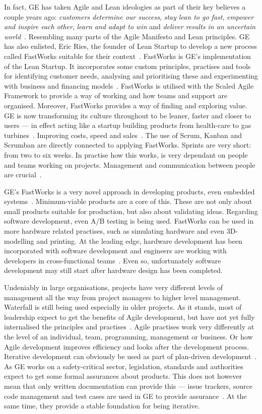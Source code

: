 \documentclass[english]{tktltiki2}
\begin{document}
In fact, GE has taken Agile and Lean ideologies as part of their key believes a couple years ago: \emph{customers determine our success}, \emph{stay lean to go fast}, \emph{empower and inspire each other}, \emph{learn and adapt to win} and \emph{deliver results in an uncertain world}~\cite{BT15}. Resembling many parts of the Agile Manifesto and Lean principles. GE has also enlisted, Eric Ries, the founder of Lean Startup to develop a new process called FastWorks suitable for their context~\cite{GE13, Clo14, Pow14, BT15}. FastWorks is GE’s implementation of the Lean Startup. It incorporates some custom principles, practises and tools for identifying customer needs, analysing and prioritising these and experimenting with business and financing models~\cite{BT15}. FastWorks is utilised with the Scaled Agile Framework to provide a way of working and how teams and support are organised. Moreover, FastWorks provides a way of finding and exploring value. GE is now transforming its culture throughout to be leaner, faster and closer to users — in effect acting like a startup building products from health-care to gas turbines~\cite{GE13, Clo14, Pow14}. Improving costs, speed and sales~\cite{Pow14}. The use of Scrum, Kanban and Scrumban are directly connected to applying FastWorks. Sprints are very short: from two to six weeks. In practise how this works, is very dependant on people and teams working on projects. Management and communication between people are crucial~\cite{BT15}.

GE’s FastWorks is a very novel approach in developing products, even embedded systems~\cite{BT15}. Minimum-viable products are a core of this. These are not only about small products suitable for production, but also about validating ideas. Regarding software development, even A/B testing is being used. FastWorks can be used in more hardware related practises, such as simulating hardware and even 3D-modelling and printing. At the leading edge, hardware development has been incorporated with software development and engineers are working with developers in cross-functional teams~\cite{BT15}. Even so, unfortunately software development may still start after hardware design has been completed.

Undeniably in large organisations, projects have very different levels of management all the way from project managers to higher level management. Waterfall is still being used especially in older projects. As it stands, most of leadership expect to get the benefits of Agile development, but have not yet fully internalised the principles and practises~\cite{BT15}. Agile practises work very differently at the level of an individual, team, programming, management or business. Or how Agile development improves efficiency and looks after the development process. Iterative development can obviously be used as part of plan-driven development~\cite{BT15}. As GE works on a safety-critical sector, legislation, standards and authorities expect to get some formal assurances about products. This does not however mean that only written documentation can provide this — issue trackers, source code management and test cases are used in GE to provide assurance~\cite{BT15}. At the same time, they provide a stable foundation for being iterative.
\end{document}
